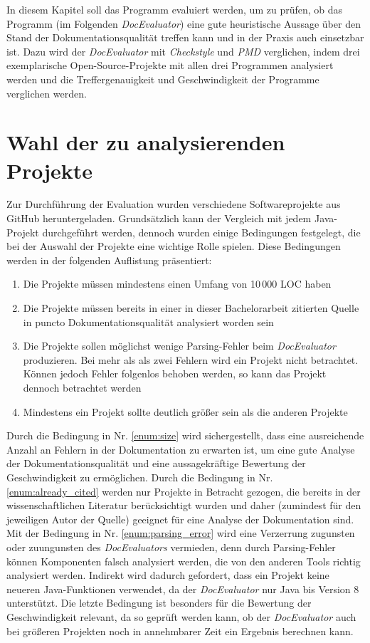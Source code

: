 \newcommand{\checkpmd}{\textit{Checkstyle} und \textit{PMD} }
\newcommand{\doceval}{\textit{DocEvaluator} }
In diesem Kapitel soll das Programm evaluiert werden, um zu prüfen, ob das Programm (im Folgenden \textit{DocEvaluator}) eine gute heuristische Aussage über den Stand der Dokumentationsqualität treffen kann und in der Praxis auch einsetzbar ist. Dazu wird der \textit{DocEvaluator} mit \checkpmd{} verglichen, indem drei exemplarische Open-Source-Projekte mit allen drei Programmen analysiert werden und die Treffergenauigkeit und Geschwindigkeit der Programme verglichen werden. 

\section{Wahl der zu analysierenden Projekte}
Zur Durchführung der Evaluation wurden verschiedene Softwareprojekte aus GitHub heruntergeladen. Grundsätzlich kann der Vergleich mit jedem Java-Projekt durchgeführt werden, dennoch wurden einige Bedingungen festgelegt, die bei der Auswahl der Projekte eine wichtige Rolle spielen. Diese Bedingungen werden in der folgenden Auflistung präsentiert:

\begin{enumerate}
    \item \label{enum:size} Die Projekte müssen mindestens einen Umfang von 10\,000 \ac{LOC} haben
    \item \label{enum:already_cited} Die Projekte müssen bereits in einer in dieser Bachelorarbeit zitierten Quelle in puncto Dokumentationsqualität analysiert worden sein
    \item \label{enum:parsing_error}  Die Projekte sollen möglichst wenige Parsing-Fehler beim \doceval produzieren. Bei mehr als als zwei Fehlern wird ein Projekt nicht betrachtet. Können jedoch Fehler folgenlos behoben werden, so kann das Projekt dennoch betrachtet werden
    \item Mindestens ein Projekt sollte deutlich größer sein als die anderen Projekte
\end{enumerate}
 Durch die Bedingung in Nr. \ref{enum:size} wird sichergestellt, dass eine ausreichende Anzahl an Fehlern in der Dokumentation zu erwarten ist, um eine gute Analyse der Dokumentationsqualität  und eine aussagekräftige Bewertung der Geschwindigkeit zu ermöglichen. Durch die Bedingung in Nr.  \ref{enum:already_cited} werden nur Projekte in Betracht gezogen, die bereits in der wissenschaftlichen Literatur berücksichtigt wurden und daher (zumindest für den jeweiligen Autor der Quelle) geeignet für eine Analyse der Dokumentation sind. Mit der Bedingung in Nr. \ref{enum:parsing_error} wird eine Verzerrung zugunsten oder zuungunsten des \textit{DocEvaluators} vermieden, denn durch Parsing-Fehler können Komponenten falsch analysiert werden, die von den anderen Tools richtig analysiert werden. Indirekt wird dadurch gefordert, dass ein Projekt keine neueren Java-Funktionen verwendet, da  der \textit{DocEvaluator} nur Java bis Version 8 unterstützt. Die letzte Bedingung ist besonders für die Bewertung der Geschwindigkeit relevant, da so geprüft werden kann, ob der \doceval auch bei größeren Projekten noch in annehmbarer Zeit ein Ergebnis berechnen kann. 
 
